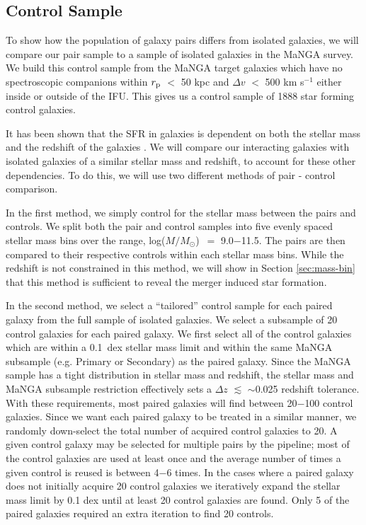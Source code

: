 \documentclass[iop,revtex4,twocolumn,apj,numberedappendix,appendixfloats]{emulateapj}
\newcommand{\logm}{log($M/M_{\odot}$)}
\begin{document}
\subsection{Control Sample}\label{sec:control}

To show how the population of galaxy pairs differs from isolated galaxies, we will compare our pair sample to a sample of isolated galaxies in the MaNGA survey. We build this control sample from the MaNGA target galaxies which have no spectroscopic companions within $r_{\rm p}$ $<$ 50 kpc and $\Delta v$ $<$ 500 km s$^{-1}$ either inside or outside of the IFU. This gives us a control sample of 1888 star forming control galaxies. 

It has been shown that the SFR in galaxies is dependent on both the stellar mass and the redshift of the galaxies \citep[e.g.,][]{Noeske:2007}. We will compare our interacting galaxies with isolated galaxies of a similar stellar mass and redshift, to account for these other dependencies. To do this, we will use two different methods of pair - control comparison. 

In the first method, we simply control for the stellar mass between the pairs and controls. We split both the pair and control samples into five evenly spaced stellar mass bins over the range, \logm\ $=$ 9.0$-$11.5. The pairs are then compared to their respective controls within each stellar mass bins. While the redshift is not constrained in this method, we will show in Section \ref{sec:mass-bin} that this method is sufficient to reveal the merger induced star formation. 

In the second method, we select a ``tailored'' control sample for each paired galaxy from the full sample of isolated galaxies. We select a subsample of 20 control galaxies for each paired galaxy. We first select all of the control galaxies which are within a 0.1~dex stellar mass limit and within the same MaNGA subsample (e.g. Primary or Secondary) as the paired galaxy. Since the MaNGA sample has a tight distribution in stellar mass and redshift, the stellar mass and MaNGA subsample restriction effectively sets a $\Delta z$ $\lesssim$ $\sim$0.025 redshift tolerance. With these requirements, most paired galaxies will find between 20$-$100 control galaxies. Since we want each paired galaxy to be treated in a similar manner, we randomly down-select the total number of acquired control galaxies to 20. A given control galaxy may be selected for multiple pairs by the pipeline; most of the control galaxies are used at least once and the average number of times a given control is reused is between 4$-$6 times. In the cases where a paired galaxy does not initially acquire 20 control galaxies we iteratively expand the stellar mass limit by 0.1 dex until at least 20 control galaxies are found. Only 5 of the paired galaxies required an extra iteration to find 20 controls. 
\end{document}
